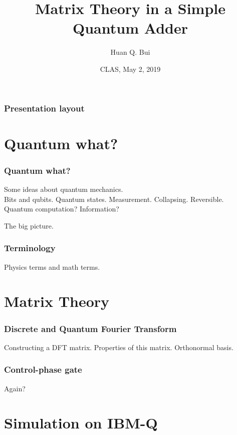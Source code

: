 \documentclass{beamer}
\title{Matrix Theory in a Simple Quantum Adder}
\author[Huan Q. Bui] %
{Huan Q. Bui}
\institute[Colby College] %
{
	
	Matrix Analysis
	\and
	Professor Leo Livshits
}
\date{CLAS, May 2, 2019}
\theoremstyle{definition}
\begin{document}
 
\frame{\titlepage}
 
\begin{frame}
\frametitle{Presentation layout}
\tableofcontents
\end{frame}

\section{Quantum what?}

\begin{frame}
\frametitle{Quantum what?}
Some ideas about quantum mechanics.\\

Bits and qubits. Quantum states. Measurement. Collapsing. Reversible.\\

Quantum computation? Information?

The big picture.
\end{frame}

\begin{frame}
\frametitle{Terminology}

Physics terms and math terms.

\end{frame}











\section{Matrix Theory}

\begin{frame}
\frametitle{Discrete and Quantum Fourier Transform}
Constructing a DFT matrix.
Properties of this matrix.
Orthonormal basis.
\end{frame}

\begin{frame}
\frametitle{Control-phase gate}
Again?
\end{frame}












\section{Simulation on IBM-Q}
\end{document}
